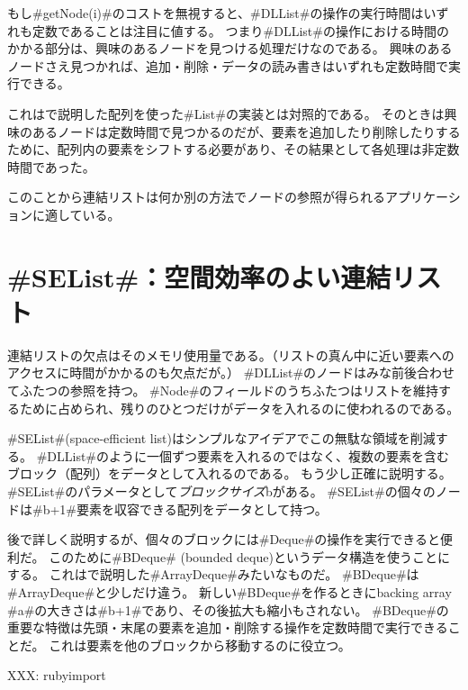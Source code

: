 もし#getNode(i)#のコストを無視すると、#DLList#の操作の実行時間はいずれも定数であることは注目に値する。
つまり#DLList#の操作における時間のかかる部分は、興味のあるノードを見つける処理だけなのである。
興味のあるノードさえ見つかれば、追加・削除・データの読み書きはいずれも定数時間で実行できる。

これはで説明した配列を使った#List#の実装とは対照的である。
そのときは興味のあるノードは定数時間で見つかるのだが、要素を追加したり削除したりするために、配列内の要素をシフトする必要があり、その結果として各処理は非定数時間であった。

このことから連結リストは何か別の方法でノードの参照が得られるアプリケーションに適している。

\section{#SEList#：空間効率のよい連結リスト}

%
%
連結リストの欠点はそのメモリ使用量である。（リストの真ん中に近い要素へのアクセスに時間がかかるのも欠点だが。）
#DLList#のノードはみな前後合わせてふたつの参照を持つ。
#Node#のフィールドのうちふたつはリストを維持するために占められ、残りのひとつだけがデータを入れるのに使われるのである。

#SEList#(space-efficient list)はシンプルなアイデアでこの無駄な領域を削減する。
#DLList#のように一個ずつ要素を入れるのではなく、複数の要素を含むブロック（配列）をデータとして入れるのである。
もう少し正確に説明する。
#SEList#のパラメータとして\emph{ブロックサイズ}bがある。
#SEList#の個々のノードは#b+1#要素を収容できる配列をデータとして持つ。

後で詳しく説明するが、個々のブロックには#Deque#の操作を実行できると便利だ。
このために#BDeque# (bounded deque)というデータ構造を使うことにする。
%
%
%
これはで説明した#ArrayDeque#みたいなものだ。
#BDeque#は#ArrayDeque#と少しだけ違う。
新しい#BDeque#を作るときにbacking array #a#の大きさは#b+1#であり、その後拡大も縮小もされない。
#BDeque#の重要な特徴は先頭・末尾の要素を追加・削除する操作を定数時間で実行できることだ。
これは要素を他のブロックから移動するのに役立つ。


XXX: rubyimport

